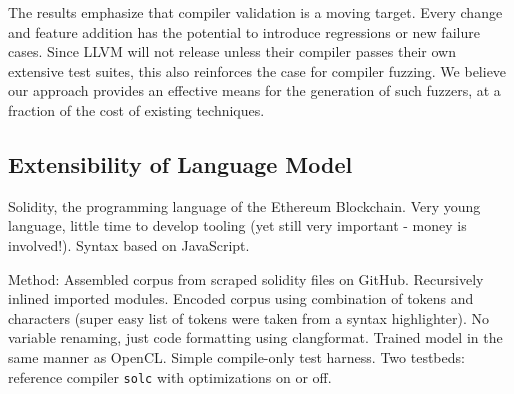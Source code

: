 \begin{table}
  \footnotesize %
  \centering %
  
  \caption{%
    The number of DeepSmith programs which trigger distinct Clang front-end assertions, and the number of programs which trigger unreachables.%
  }
  \label{tab:clangs}
\end{table}

The results emphasize that compiler validation is a moving target. Every change and feature addition has the potential to introduce regressions or new failure cases. Since LLVM will not release unless their compiler passes their own extensive test suites, this also reinforces the case for compiler fuzzing. We believe our approach provides an effective means for the generation of such fuzzers, at a fraction of the cost of existing techniques.


\subsection{Extensibility of Language Model}


Solidity, the programming language of the Ethereum Blockchain. Very young language, little time to develop tooling (yet still very important - money is involved!). Syntax based on JavaScript.

Method: Assembled corpus from scraped solidity files on GitHub. Recursively inlined imported modules. Encoded corpus using combination of tokens and characters (super easy list of tokens were taken from a syntax highlighter). No variable renaming, just code formatting using clangformat. Trained model in the same manner as OpenCL.  Simple compile-only test harness. Two testbeds: reference compiler \texttt{solc} with optimizations on or off.

